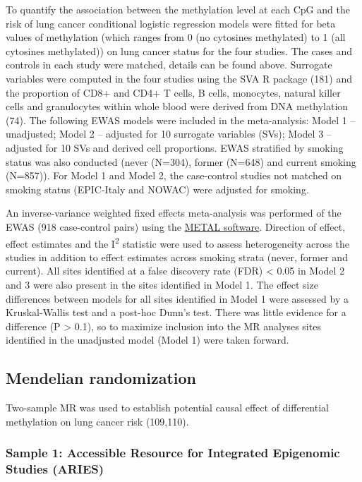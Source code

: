 \documentclass[11pt,oneside]{bristolthesis}
\begin{document}
To quantify the association between the methylation level at each CpG and the risk of lung cancer conditional logistic regression models were fitted for beta values of methylation (which ranges from 0 (no cytosines methylated) to 1 (all cytosines methylated)) on lung cancer status for the four studies. The cases and controls in each study were matched, details can be found above. Surrogate variables were computed in the four studies using the SVA R package (181) and the proportion of CD8+ and CD4+ T cells, B cells, monocytes, natural killer cells and granulocytes within whole blood were derived from DNA methylation (74). The following EWAS models were included in the meta-analysis: Model 1 -- unadjusted; Model 2 -- adjusted for 10 surrogate variables (SVs); Model 3 -- adjusted for 10 SVs and derived cell proportions. EWAS stratified by smoking status was also conducted (never (N=304), former (N=648) and current smoking (N=857)). For Model 1 and Model 2, the case-control studies not matched on smoking status (EPIC-Italy and NOWAC) were adjusted for smoking.

An inverse-variance weighted fixed effects meta-analysis was performed of the EWAS (918 case-control pairs) using the \href{http://csg.sph.umich.edu/abecasis/metal/}{METAL software}. Direction of effect, effect estimates and the I\textsuperscript{2} statistic were used to assess heterogeneity across the studies in addition to effect estimates across smoking strata (never, former and current). All sites identified at a false discovery rate (FDR) \textless{} 0.05 in Model 2 and 3 were also present in the sites identified in Model 1. The effect size differences between models for all sites identified in Model 1 were assessed by a Kruskal-Wallis test and a post-hoc Dunn's test. There was little evidence for a difference (P \textgreater{} 0.1), so to maximize inclusion into the MR analyses sites identified in the unadjusted model (Model 1) were taken forward.

\hypertarget{methods-mendelian-randomization-07}{%
\subsection{Mendelian randomization}\label{methods-mendelian-randomization-07}}

Two-sample MR was used to establish potential causal effect of differential methylation on lung cancer risk (109,110).

\hypertarget{sample-1-accessible-resource-for-integrated-epigenomic-studies-aries}{%
\subsubsection{Sample 1: Accessible Resource for Integrated Epigenomic Studies (ARIES)}\label{sample-1-accessible-resource-for-integrated-epigenomic-studies-aries}}
\end{document}
